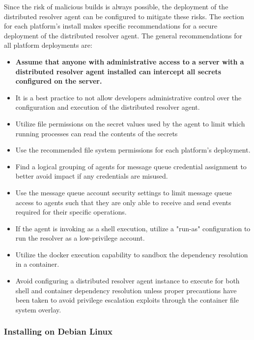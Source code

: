 Since the risk of malicious builds is always possible, the deployment of the distributed resolver agent
can be configured to mitigate these risks.  The section for each platform's install makes specific
recommendations for a secure deployment of the distributed resolver agent.  The general recommendations
for all platform deployments are:

\begin{itemize}
  \item \textbf{Assume that anyone with administrative access to a server with a distributed resolver agent installed
    can intercept all secrets configured on the \cxoneflow server.}
  \item It is a best practice to not allow developers administrative control over the configuration and
    execution of the distributed resolver agent.
  \item Utilize file permissions on the secret values used by the agent to limit which running processes
    can read the contents of the secrets
  \item Use the recommended file system permissions for each platform's deployment.
  \item Find a logical grouping of agents for message queue credential assignment to better avoid
    impact if any credentials are misused.
  \item Use the message queue account security settings to limit message queue access to agents such that they are only
    able to receive and send events required for their specific operations.
  \item If the agent is invoking \scaresolver as a shell execution, utilize a "run-as" configuration to
    run the resolver as a low-privilege account.
  \item Utilize the \scaresolver docker execution capability to sandbox the dependency resolution in a container.
  \item Avoid configuring a distributed resolver agent instance to execute \scaresolver for both shell and container dependency resolution
    unless proper precautions have been taken to avoid privilege escalation exploits through the container file system overlay.
\end{itemize}



\subsubsection{Installing on Debian Linux}

